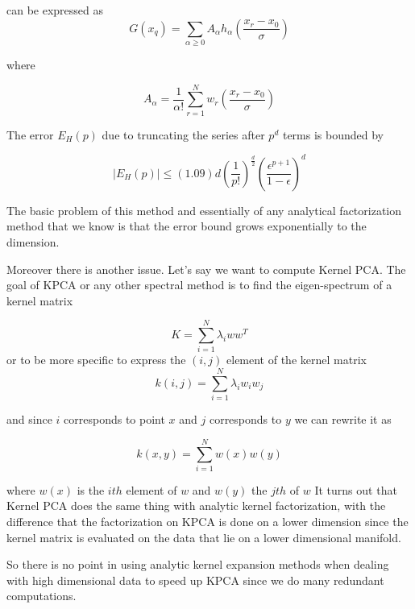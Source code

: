 \documentclass[12pt,letterpaper,doublespaced,ETD,dvips,proposal]{gtthesis}
\begin{document}
\begin{Body}
can be expressed as
\begin{equation}
  G(x_q)=\sum_{\alpha\geq 0} A_{\alpha} h_{\alpha}
  \left(\frac{x_r-x_0}{\sigma}\right)
\end{equation}

where

\begin{equation}
  A_{\alpha} = \frac{1}{\alpha!}
  \sum_{r=1}^{N}w_r\left(\frac{x_r-x_0}{\sigma}\right)
\end{equation}

The error $E_H(p)$ due to truncating the series after $p^d$ terms is
bounded by

\begin{equation}
|E_H(p)|\leq (1.09)d\left(\frac{1}{p!}\right)^{\frac{d}{2}}
\left(\frac{\epsilon^{p+1}}{1-\epsilon}\right)^d
\end{equation}

The basic problem of this method and essentially of any analytical
factorization method that we know is that the error bound grows
exponentially to the dimension.

Moreover there is another issue. Let's say we want to compute Kernel
PCA. The goal of KPCA or any other spectral method is to find the
eigen-spectrum of a kernel matrix

\begin{equation}
K = \sum_{i=1}^{N}\lambda_i ww^T
\end{equation}
or to be more specific to express the $(i, j)$ element of the kernel matrix
\begin{equation}
k(i,j)=\sum_{i=1}^{N}\lambda_i w_i w_j
\end{equation}

and since $i$ corresponds to point $x$ and $j$ corresponds to $y$
we can rewrite it as

\begin{equation}
k(x,y)=\sum_{i=1}^{N}w(x)w(y)
\end{equation}

where $w(x)$ is the $ith$ element of $w$ and $w(y)$ the $jth$ of $w$
It turns out that  Kernel PCA does the same thing with analytic
kernel factorization, with the difference that the factorization on
KPCA is done on a lower dimension since the kernel matrix is
evaluated on the data that lie on a lower dimensional manifold.

So there is no point in using analytic kernel expansion methods when
dealing with high dimensional data to speed up KPCA since we do many
redundant computations.



\end{Body}
\end{document}
